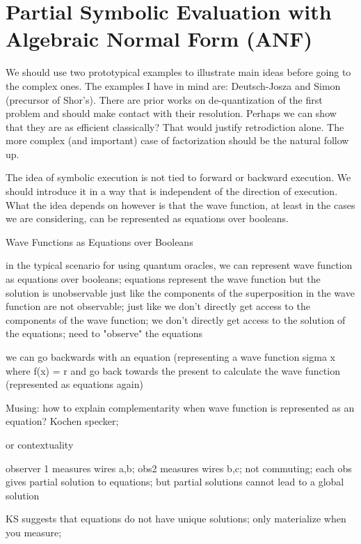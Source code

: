 \documentclass{article}
\begin{document}
\section{Partial Symbolic Evaluation with Algebraic Normal Form (ANF)}

We should use two prototypical examples to illustrate main ideas before going to the 
complex ones. The examples I have in mind are: Deutsch-Josza and Simon (precursor 
of Shor's). There are prior works on de-quantization of the first problem and should 
make contact with their resolution. Perhaps we can show that they are as 
efficient classically? That would justify retrodiction alone. The more complex 
(and important) case of factorization should be the natural follow up. 

The idea of symbolic execution is not tied to forward or backward execution. We should introduce it in a way that is independent of the direction of execution. What the idea depends on however is that the wave function, at least in the cases we are considering, can be represented as equations over booleans. 

Wave Functions as Equations over Booleans

in the typical scenario for using quantum oracles, we can represent wave function as equations over booleans; equations represent the wave function but the solution is unobservable just like the components of the superposition in the wave function are not observable; just like we don't directly get access to the components of the wave function; we don't directly get access to the solution of the equations; need to "observe" the equations

we can go backwards with an equation (representing a wave function sigma x where f(x) = r and go back towards the present to calculate the wave function (represented as equations again) 

Musing: how to explain complementarity when wave function is represented as an equation? Kochen specker;
 
or contextuality
 
observer 1 measures wires a,b; obs2 measures wires b,c; not commuting; each obs gives partial solution to equations; but partial solutions cannot lead to a global solution
 
KS suggests that equations do not have unique solutions; only materialize when you measure;
\end{document}
